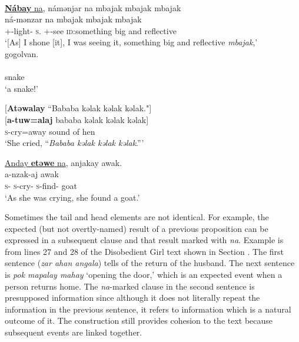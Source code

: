 \medskip
{}\\
\underline{\textbf{Nábay}  na},  námənjar  na  mbajak  mbajak  mbajak\\  
\gll  {}  ná-mənzar na {mbajak   mbajak    mbajak}\\ 
      {\oneS}+{\IFV}-light{}-{\CL}    \textsc{s}.{\DO}   {\oneS}+{\IFV}-see  {\PSP}  {\textsc{id}:something big and reflective}\\   
\glt ‘[As] I shone [it], I was seeing it, something big and reflective \textit{mbajak},’\\
      
      \medskip
gogolvan.\\      
 \\
     snake\\
\glt  ‘a snake!’
\z

\clearpage
\ea \label{ex:11:25}
{}[\textbf{Atəwalay} “Bababa  kəlak  kəlak  kəlak."]\\  
\gll  {}[\textbf{a-tuw=alaj} {bababa  kəlak kəlak kəlak}]\\ 
      \textsc{s}-cry=away {sound of hen}\\ 
\glt ‘She cried, “\textit{Bababa kəlak  kəlak  kəlak}.”’

\medskip
\underline{Anday  \textbf{etəwe}  na},  anjakay  awak.\\
\gll {}   a-nzak-aj   awak\\
     \textsc{s}-{\PRG}  \textsc{s}-cry-{\CL}  {\PSP}  \textsc{s}-find-{\CL}  goat\\
\glt  ‘As she was crying, she found a goat.’ 
\z

Sometimes the tail and head elements are not identical. For example, the expected (but not overtly-named) result of a previous proposition can be expressed in a subsequent clause and that result marked with \textit{na}. Example  is from lines 27 and 28 of the Disobedient Girl text shown in Section . The first sentence (\textit{zar ahan angala}) tells of the return of the husband. The next sentence is \textit{pok mapalay mahay} ‘opening the door,’ which is an expected event when a person returns home. The \textit{na}{}-marked clause in the second sentence is presupposed information since although it does not literally repeat the information in the previous sentence, it refers to information which is a natural outcome of it. The construction still provides cohesion to the text because subsequent events are linked together. 

